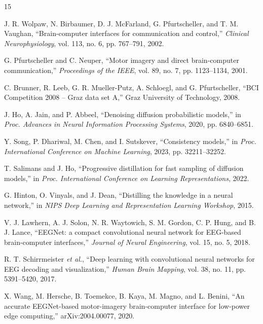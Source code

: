 \documentclass[11pt]{article}
\begin{document}
\begin{thebibliography}{15}

J. R. Wolpaw, N. Birbaumer, D. J. McFarland, G. Pfurtscheller, and T. M. Vaughan, ``Brain-computer interfaces for communication and control,'' \emph{Clinical Neurophysiology}, vol. 113, no. 6, pp. 767--791, 2002.

G. Pfurtscheller and C. Neuper, ``Motor imagery and direct brain-computer communication,'' \emph{Proceedings of the IEEE}, vol. 89, no. 7, pp. 1123--1134, 2001.

C. Brunner, R. Leeb, G. R. Mueller-Putz, A. Schloegl, and G. Pfurtscheller, ``BCI Competition 2008 -- Graz data set A,'' Graz University of Technology, 2008.

J. Ho, A. Jain, and P. Abbeel, ``Denoising diffusion probabilistic models,'' in \emph{Proc. Advances in Neural Information Processing Systems}, 2020, pp. 6840--6851.

Y. Song, P. Dhariwal, M. Chen, and I. Sutskever, ``Consistency models,'' in \emph{Proc. International Conference on Machine Learning}, 2023, pp. 32211--32252.

T. Salimans and J. Ho, ``Progressive distillation for fast sampling of diffusion models,'' in \emph{Proc. International Conference on Learning Representations}, 2022.

G. Hinton, O. Vinyals, and J. Dean, ``Distilling the knowledge in a neural network,'' in \emph{NIPS Deep Learning and Representation Learning Workshop}, 2015.

V. J. Lawhern, A. J. Solon, N. R. Waytowich, S. M. Gordon, C. P. Hung, and B. J. Lance, ``EEGNet: a compact convolutional neural network for EEG-based brain-computer interfaces,'' \emph{Journal of Neural Engineering}, vol. 15, no. 5, 2018.

R. T. Schirrmeister \emph{et al.}, ``Deep learning with convolutional neural networks for EEG decoding and visualization,'' \emph{Human Brain Mapping}, vol. 38, no. 11, pp. 5391--5420, 2017.

X. Wang, M. Hersche, B. Toemekce, B. Kaya, M. Magno, and L. Benini, ``An accurate EEGNet-based motor-imagery brain-computer interface for low-power edge computing,'' arXiv:2004.00077, 2020.


\end{thebibliography}
\end{document}
